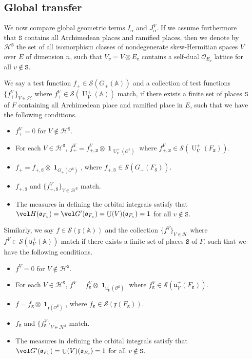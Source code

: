\documentclass[letterpaper,11pt]{amsart}
\newcommand{\fo}{\mathfrak{o}}
\newcommand{\fu}{\mathfrak{u}}
\newcommand{\fx}{\mathfrak{x}}
\newcommand{\bA}{\mathbb{A}}
\newcommand{\cH}{\mathcal{H}}
\newcommand{\cO}{\mathcal{O}}
\newcommand{\cS}{\mathcal{S}}
\newcommand{\tS}{\mathtt{S}}
\newcommand{\<}{\negthickspace}
\DeclareMathOperator{\U}{U}
\DeclareMathOperator{\id}{\mathbf{1}}
\theoremstyle{definition}
\theoremstyle{plain}
\theoremstyle{remark}
\numberwithin{equation}{section}
\begin{document}
\subsection{Global transfer}
\label{subsubsec:global_transfer}

We now compare global geometric terms $I_{\alpha}$ and $J_{\alpha}^V$. If we assume
furthermore that $\tS$ contains all Archimedean places and ramified places,
then we denote by $\cH^{\tS}$ the set of all isomorphism classes of nondegenerate
skew-Hermitian spaces $V$ over $E$ of dimension $n$, such that $V_v = V
\otimes E_v$ contains a self-dual $\cO_{E_v}$ lattice for all $v \not\in
\tS$.

We say a test
function $f_+ \in \cS(G_+(\bA))$ and a collection of test functions
$\{f_+^{V}\}_{V \in \cH}$ where $f_+^{V} \in \cS(\U^+_V(\bA))$ match, if
there exists a finite set of places $\tS$ of $F$ containing all Archimedean
place and ramified place in $E$, such that we have the following conditions.
\begin{itemize}
    \item $f^{V}_+ = 0$ for $V \not \in \cH^{\tS}$.

    \item For each $V \in \cH^{\tS}$, $f^{V}_+ = 
        f^{V}_{+,\tS} \otimes \id_{\U^+_V(\cO^\tS)}$ where $f^{V}_{+,\tS}
        \in \cS(\U_V^+(F_\tS))$.

    \item $f_+ = f_{+,\tS} \otimes
        \id_{G_+(\cO^\tS)}$, where $f_{+,\tS} \in \cS(G_+(F_\tS))$.

    \item $f_{+,\tS}$ and $\{f^{V}_{+,\tS}\}_{V \in \cH^{\tS}}$ match.

    \item The measures in defining the orbital integrals satisfy that $\vol H(\fo_{F_v})= \vol G'(\fo_{F_v})= \U(V)(\fo_{F_v}) = 1$ for all $v \not \in \tS$.
\end{itemize}



Similarly, we say $f \in \cS(\fx(\bA))$ and  the collection $\{f^{V}\}_{V
\in \cH}$ where $f^{V} \in \cS(\fu^+_V(\bA))$ match if there exists a finite
set of places $\tS$ of $F$, such that we have the following conditions.
\begin{itemize}
    \item $f^{V} = 0$ for $V \not \in \cH^{\tS}$.

    \item For each $V \in \cH^{\tS}$, $f^{V} =
        f^{V}_\tS \otimes \id_{\fu^+_V(\cO^\tS)}$ where $f^{V}_\tS \in
        \cS(\fu_V^+(F_\tS))$.

    \item $f = f_\tS \otimes
        \id_{\fx(\cO^\tS)}$, where $f_\tS \in \cS(\fx(F_\tS))$.

    \item $f_\tS$ and $\{f^{V}_\tS\}_{V \in \cH^{\tS}}$ match.

    \item The measures in defining the orbital integrals satisfy that $\vol G'(\fo_{F_v})= \U(V)(\fo_{F_v}) = 1$ for all $v \not \in \tS$.
\end{itemize}
\end{document}
